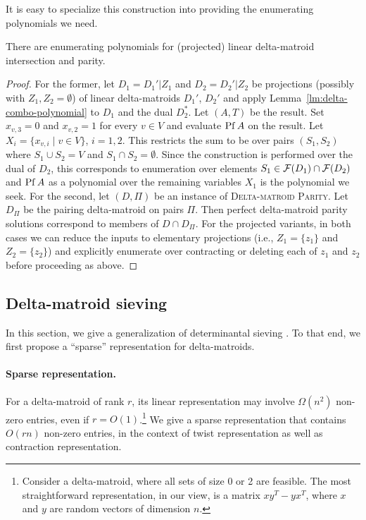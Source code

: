 It is easy to specialize this construction into providing the enumerating polynomials we need.

\begin{corollary} \label{cor:intersection-enum}
  There are enumerating polynomials for (projected) linear delta-matroid intersection  
  and parity.
\end{corollary}
\begin{proof}
  For the former, let $D_1=D_1'|Z_1$ and $D_2=D_2'|Z_2$ be projections (possibly with $Z_1, Z_2=\emptyset$)
  of linear delta-matroids $D_1'$, $D_2'$ and apply Lemma~\ref{lm:delta-combo-polynomial}
  to $D_1$ and the dual $D_2^*$. Let $(A,T)$ be the result. Set $x_{v,3}=0$ and $x_{v,2}=1$ for every $v \in V$
  and evaluate $\operatorname{Pf} A$ on the result. Let $X_i=\{x_{v,i} \mid v \in V\}$, $i=1, 2$. 
  This restricts the sum to be over pairs $(S_1,S_2)$ where $S_1 \cup S_2=V$
  and $S_1 \cap S_2=\emptyset$. Since the construction is performed over the dual of $D_2$,
  this corresponds to enumeration over elements $S_1 \in \mathcal F(D_1) \cap \mathcal F(D_2)$
  and $\operatorname{Pf} A$ as a polynomial over the remaining variables $X_1$ is the polynomial we seek.
  For the second, let $(D,\Pi)$ be an instance of \textsc{Delta-matroid Parity}.
  Let $D_\Pi$ be the pairing delta-matroid on pairs $\Pi$.
  Then perfect delta-matroid parity solutions correspond to members of $D \cap D_\Pi$. 
  For the projected variants, in both cases we can reduce the inputs to elementary projections
  (i.e., $Z_1=\{z_1\}$ and $Z_2=\{z_2\}$) and explicitly enumerate over contracting or
  deleting each of $z_1$ and $z_2$ before proceeding as above. 
\end{proof}

\subsection{Delta-matroid sieving}
\label{sec:dm-sieve}

In this section, we give a generalization of determinantal sieving \cite{EKW23}.
To that end, we first propose a ``sparse'' representation for delta-matroids.

\paragraph*{Sparse representation.}

For a delta-matroid of rank $r$, its linear representation may involve $\Omega(n^2)$ non-zero entries, even if $r = O(1)$.\footnote{Consider a delta-matroid, where all sets of size 0 or 2 are feasible. The most straightforward representation, in our view, is a matrix $xy^T - yx^T$, where $x$ and $y$ are random vectors of dimension $n$.}
We give a sparse representation that contains $O(rn)$ non-zero entries, in the context of twist representation as well as contraction representation.

